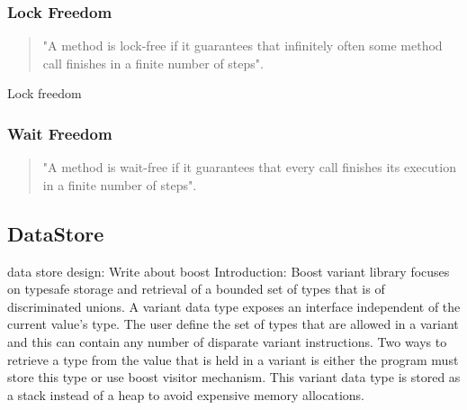 \documentclass[letterpaper, 12pt]{article}
\begin{document}
\subsubsection{Lock Freedom}
\begin{quotation}
	"A method is lock-free if it guarantees that infinitely often some method call finishes in a finite number of steps"\citep[p. 60]{artofmulti}.
\end{quotation}

Lock freedom 

\subsubsection{Wait Freedom}
\begin{quotation}
	"A method is wait-free if it guarantees that every call finishes its execution
	in a finite number of steps"\citep[p. 59]{artofmulti}.
\end{quotation}

\newpage

\subsection{DataStore}
data store design:
Write about boost
	Introduction:
	Boost variant library focuses on typesafe storage and retrieval of a bounded set of types that is 
	of discriminated unions. A variant data type exposes an interface independent of the current value's type.
	The user define the set of types that are allowed in a variant and this can contain any number of disparate
	variant instructions. Two ways to retrieve a type from the value that is held in a variant is either the program
	must store this type or use boost visitor mechanism. This variant data type is stored as a stack instead of a heap
	to avoid expensive memory allocations. 
	
\end{document}
